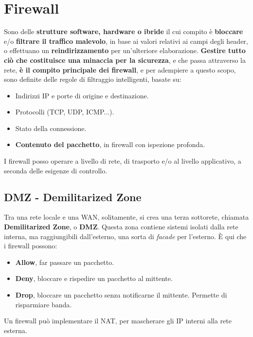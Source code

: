 \section{Firewall}
Sono delle\textbf{ strutture software, hardware o ibride} il cui compito è \textbf{bloccare} e/o \textbf{filtrare il traffico malevolo}, in base ai valori relativi ai campi degli header, o effettuano un \textbf{reindirizzamento} per un'ulteriore elaborazione. \textbf{Gestire tutto ciò che costituisce una minaccia per la sicurezza}, e che passa attraverso la rete,\textbf{ è il compito principale dei firewall}, e per adempiere a questo scopo, sono definite delle regole di filtraggio intelligenti, basate su:
\begin{itemize}
	\item Indirizzi IP e porte di origine e destinazione.
	\item Protocolli (TCP, UDP, ICMP...).
	\item Stato della connessione.
	\item \textbf{Contenuto del pacchetto}, in firewall con ispezione profonda.
\end{itemize}

I firewall posso operare a livello di rete, di trasporto e/o al livello applicativo, a seconda delle esigenze di controllo.

\subsection{DMZ - Demilitarized Zone}
Tra una rete locale e una WAN, solitamente, si crea una terza sottorete, chiamata \textbf{Demilitarized Zone}, o \textbf{DMZ}. Questa zona contiene sistemi isolati dalla rete interna, ma raggiungibili dall'esterno, una sorta di \textit{facade} per l'esterno. È qui che i firewall possono:

\begin{itemize}
	\item \textbf{Allow}, far passare un pacchetto.
	\item \textbf{Deny}, bloccare e rispedire un pacchetto al mittente.
	\item \textbf{Drop}, bloccare un pacchetto senza notificarne il mittente. Permette di risparmiare banda. 
\end{itemize}

Un firewall può implementare il NAT, per mascherare gli IP interni alla rete esterna. 
